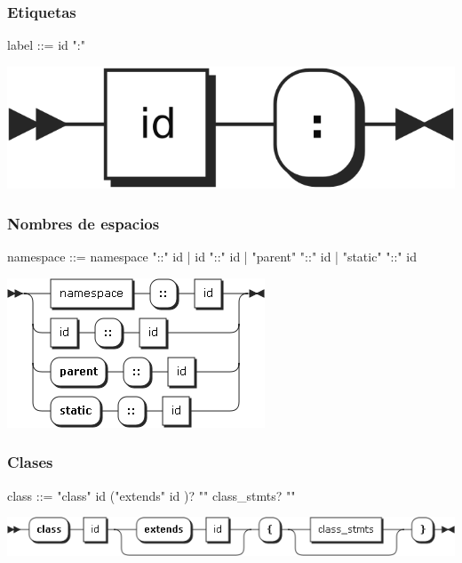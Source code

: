 \subsubsection{Etiquetas}
\begin{multicols}{2}
\begin{myverbatim}
label ::=   id ":"
\end{myverbatim}  	
\columnbreak
\begin{center}
\includegraphics[scale=0.7]{diagram/label.png} \\
\end{center}
\end{multicols}
\pagebreak
\subsubsection{Nombres de espacios}
\begin{multicols}{2}
\begin{myverbatim}[style=nonumbers, basicstyle=\tiny]      
namespace ::=  namespace "::" id
            |  id "::" id
            |  "parent" "::" id
            |  "static" "::" id
\end{myverbatim}  
\columnbreak	
\begin{center}
\includegraphics[scale=0.4]{diagram/namespace.png} \\
\end{center}
\end{multicols}
\subsubsection{Clases}
\begin{myverbatim}
class ::= "class" id ("extends" id )? "{" class_stmts? "}"
\end{myverbatim}  	
\begin{center}
\includegraphics[scale=0.6]{diagram/class_gramatic.png} \\
\end{center}
